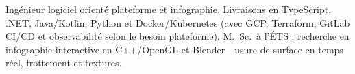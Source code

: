 

\begin{cvparagraph}

Ingénieur logiciel orienté plateforme et infographie. Livraisons en TypeScript, .NET, Java/Kotlin, Python et Docker/Kubernetes (avec GCP, Terraform, GitLab CI/CD et \mbox{observabilité} selon le besoin plateforme). M.~Sc.\ à l'ÉTS : recherche en infographie interactive en C++/OpenGL et Blender---usure de surface en temps réel, frottement et textures.
\end{cvparagraph}
